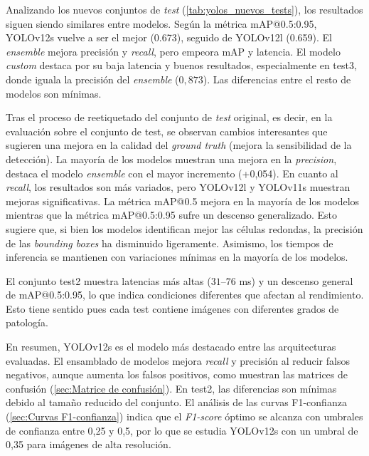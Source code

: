 \documentclass[12pt,a4paper,onecolumn,oneside]{report}
\begin{document}
Analizando los nuevos conjuntos de \textit{test} (\autoref{tab:yolos_nuevos_tests}), los resultados siguen siendo similares entre modelos. Según la métrica mAP@0.5:0.95, YOLOv12s vuelve a ser el mejor (0.673), seguido de YOLOv12l (0.659). 
El \textit{ensemble} mejora precisión y \textit{recall}, pero empeora mAP y latencia. El modelo \textit{custom} destaca por su baja latencia y buenos resultados, especialmente en test3, 
donde iguala la precisión del \textit{ensemble} ($0,873$). Las diferencias entre el resto de modelos son mínimas.

Tras el proceso de reetiquetado del conjunto de \textit{test} original, es decir, en la evaluación sobre el conjunto de test, se observan cambios interesantes que 
sugieren una mejora en la calidad del \textit{ground truth} (mejora la sensibilidad de la detección). La mayoría de los modelos muestran una mejora en la \textit{precision}, destaca el modelo \textit{ensemble} con el mayor incremento (+0,054). 
En cuanto al \textit{recall}, los resultados son más variados, pero YOLOv12l y YOLOv11s muestran mejoras significativas.
La métrica mAP@0.5 mejora en la mayoría de los modelos mientras que la métrica mAP@0.5:0.95 sufre un descenso generalizado. Esto sugiere que, si bien los modelos identifican mejor las células redondas, la precisión de las \textit{bounding boxes} ha disminuido ligeramente.
Asimismo, los tiempos de inferencia se mantienen con variaciones mínimas en la mayoría de los modelos.

El conjunto test2 muestra latencias más altas ($31$–$76$ ms) y un descenso general de mAP@0.5:0.95, lo que indica condiciones diferentes que afectan al rendimiento. 
Esto tiene sentido pues cada test contiene imágenes con diferentes grados de patología.

En resumen, YOLOv12s es el modelo más destacado entre las arquitecturas evaluadas. El ensamblado de modelos mejora \textit{recall} y precisión al reducir falsos negativos, aunque aumenta los falsos positivos, como muestran las matrices de confusión 
(\autoref{sec:Matrice de confusión}). En test2, las diferencias son mínimas debido al tamaño reducido del conjunto. El análisis de las curvas F1-confianza 
(\autoref{sec:Curvas F1-confianza}) indica que el \textit{F1-score} óptimo se alcanza con umbrales de confianza entre 0,25 y 0,5, por lo que se estudia YOLOv12s con un umbral de 0,35 
para imágenes de alta resolución.
\end{document}
